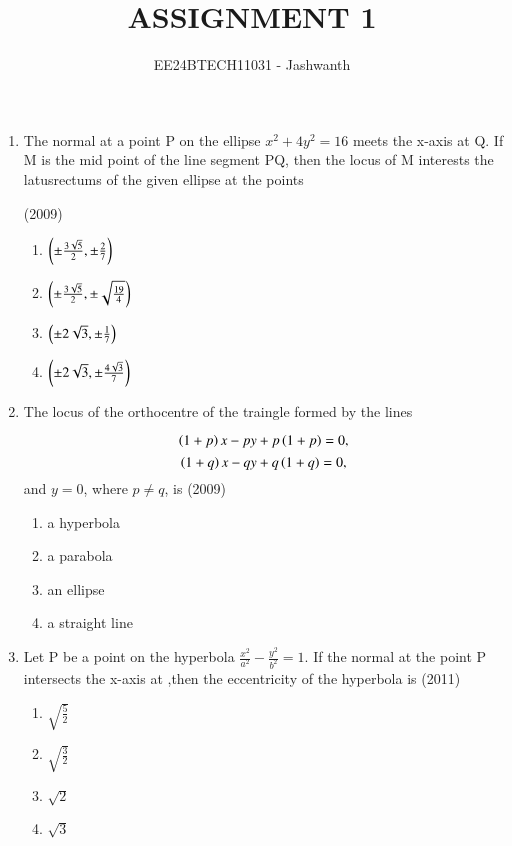 \documentclass[journal,12pt,onecolumn]{IEEEtran}
\theoremstyle{remark}
\begin{document}

\vspace{3cm}

\title{ASSIGNMENT 1}
\author{EE24BTECH11031 - Jashwanth}
\maketitle

\bigskip

\begin{enumerate}
\item The normal at a point P on the ellipse $x^2 +4y^2=16$ meets the x-axis at Q. If M is the mid point of the line segment PQ, then the locus of M interests the latusrectums of the given ellipse at the points
	
	\hfill (2009)
		\begin{enumerate}
			\item $\left(\pm\frac{3\sqrt{5}}{2},\pm\frac{2}{7}\right)$
			\item $\left(\pm\frac{3\sqrt{5}}{2},\pm\sqrt{\frac{19}{4}}\right)$
			\item $\left(\pm2\sqrt{3},\pm\frac{1}{7}\right)$
			\item $\left(\pm2\sqrt{3},\pm\frac{4\sqrt{3}}{7}\right)$	
		\end{enumerate}
		
	\item The locus of the orthocentre of the traingle formed by the lines
		
			$$\left(1+p\right)x-py+p\left(1+p\right)=0,$$
			$$\left(1+q\right)x-qy+q\left(1+q\right)=0,$$
		and $y=0$, where $p \neq q$, is
		\hfill(2009)
\begin{enumerate}
	\item a hyperbola
	\item a parabola
	\item an ellipse
	\item a straight line
\end{enumerate}

\item Let P be a point on the hyperbola $\frac{x^2}{a^2}-\frac{y^2}{b^2}=1$. If the normal at the point P intersects the x-axis at ,then the eccentricity of the hyperbola is
	\hfill (2011)\\
		\begin{enumerate}
			\item$\sqrt{\frac{5}{2}}$
			\item$\sqrt{\frac{3}{2}}$
			\item$\sqrt{2}$
			\item$\sqrt{3}$
		\end{enumerate}


\end{enumerate}
\end{document}
